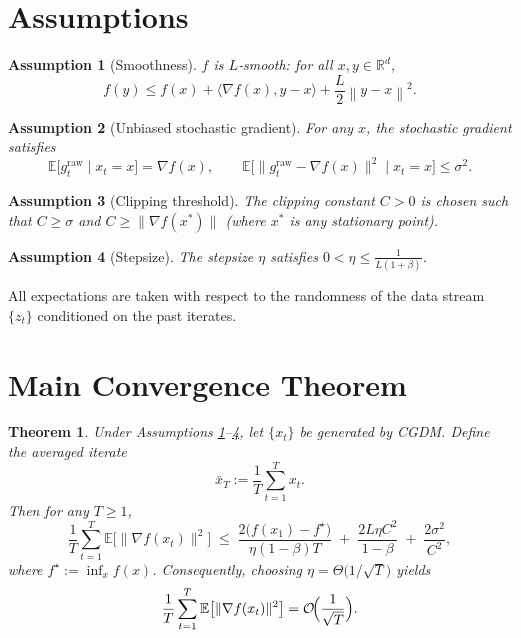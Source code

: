 \documentclass{article}
\newtheorem{theorem}{Theorem}
\newtheorem{assumption}{Assumption}
\newcommand{\E}{\mathbb{E}}
\newcommand{\R}{\mathbb{R}}
\newcommand{\norm}[1]{\left\|#1\right\|}
\begin{document}
\section*{Assumptions}
\begin{assumption}[Smoothness]\label{as:smooth}
$f$ is $L$‑smooth: for all $x,y\in\R^d$,
\[
f(y)\le f(x)+\langle\nabla f(x),y-x\rangle+\frac{L}{2}\norm{y-x}^2 .
\]
\end{assumption}
\begin{assumption}[Unbiased stochastic gradient]\label{as:unbiased}
For any $x$, the stochastic gradient satisfies
\[
\E\bigl[g_t^{\text{raw}}\mid x_t=x\bigr]=\nabla f(x),\qquad
\E\bigl[\|g_t^{\text{raw}}-\nabla f(x)\|^2\mid x_t=x\bigr]\le\sigma^2 .
\]
\end{assumption}
\begin{assumption}[Clipping threshold]\label{as:clip}
The clipping constant $C>0$ is chosen such that $C\ge \sigma$ and $C\ge\|\nabla f(x^*)\|$ (where $x^*$ is any stationary point).
\end{assumption}
\begin{assumption}[Stepsize]\label{as:stepsize}
The stepsize $\eta$ satisfies $0<\eta\le \frac{1}{L(1+\beta)}$.
\end{assumption}

All expectations are taken with respect to the randomness of the data stream $\{z_t\}$ conditioned on the past iterates.

\section*{Main Convergence Theorem}
\begin{theorem}\label{thm:main}
Under Assumptions \ref{as:smooth}–\ref{as:stepsize}, let $\{x_t\}$ be generated by CGDM. Define the averaged iterate
\[
\bar x_T:=\frac{1}{T}\sum_{t=1}^{T}x_t .
\]
Then for any $T\ge 1$,
\[
\frac{1}{T}\sum_{t=1}^{T}\E\bigl[\|\nabla f(x_t)\|^2\bigr]
\;\le\;
\frac{2\bigl(f(x_1)-f^\star\bigr)}{\eta (1-\beta) T}
\;+\;
\frac{2L\eta C^2}{1-\beta}
\;+\;
\frac{2\sigma^2}{C^2},
\]
where $f^\star:=\inf_x f(x)$. Consequently, choosing $\eta = \Theta\bigl(1/\sqrt{T}\bigr)$ yields
\[
\frac{1}{T}\sum_{t=1}^{T}\E\bigl[\|\nabla f(x_t)\|^2\bigr]=\mathcal O\!\Bigl(\frac{1}{\sqrt{T}}\Bigr).
\]
\end{theorem}
\end{document}
